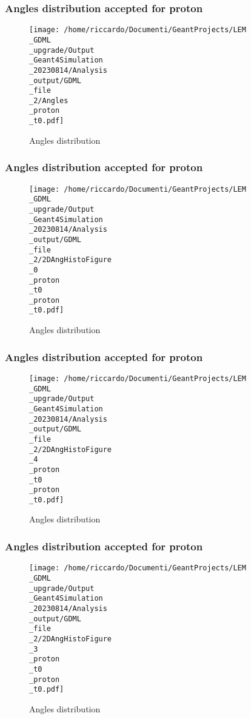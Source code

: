 \documentclass[8pt]{beamer}
\begin{document}
            \begin{frame}
                \frametitle{Angles distribution accepted for proton}
            
        \begin{figure}[h]
            \centering
            \texttt{[image: /home/riccardo/Documenti/GeantProjects/LEM\\\_GDML\\\_upgrade/Output\\\_Geant4Simulation\\\_20230814/Analysis\\\_output/GDML\\\_file\\\_2/Angles\\\_proton\\\_t0.pdf]}
            \caption{Angles distribution}
        \end{figure}
        
            \end{frame}
            
            \begin{frame}
                \frametitle{Angles distribution accepted for proton}
            
        \begin{figure}[h]
            \centering
            \texttt{[image: /home/riccardo/Documenti/GeantProjects/LEM\\\_GDML\\\_upgrade/Output\\\_Geant4Simulation\\\_20230814/Analysis\\\_output/GDML\\\_file\\\_2/2DAngHistoFigure\\\_0\\\_proton\\\_t0\\\_proton\\\_t0.pdf]}
            \caption{Angles distribution}
        \end{figure}
        
            \end{frame}
            
            \begin{frame}
                \frametitle{Angles distribution accepted for proton}
            
        \begin{figure}[h]
            \centering
            \texttt{[image: /home/riccardo/Documenti/GeantProjects/LEM\\\_GDML\\\_upgrade/Output\\\_Geant4Simulation\\\_20230814/Analysis\\\_output/GDML\\\_file\\\_2/2DAngHistoFigure\\\_4\\\_proton\\\_t0\\\_proton\\\_t0.pdf]}
            \caption{Angles distribution}
        \end{figure}
        
            \end{frame}
            
            \begin{frame}
                \frametitle{Angles distribution accepted for proton}
            
        \begin{figure}[h]
            \centering
            \texttt{[image: /home/riccardo/Documenti/GeantProjects/LEM\\\_GDML\\\_upgrade/Output\\\_Geant4Simulation\\\_20230814/Analysis\\\_output/GDML\\\_file\\\_2/2DAngHistoFigure\\\_3\\\_proton\\\_t0\\\_proton\\\_t0.pdf]}
            \caption{Angles distribution}
        \end{figure}
        
            \end{frame}
            
\end{document}
